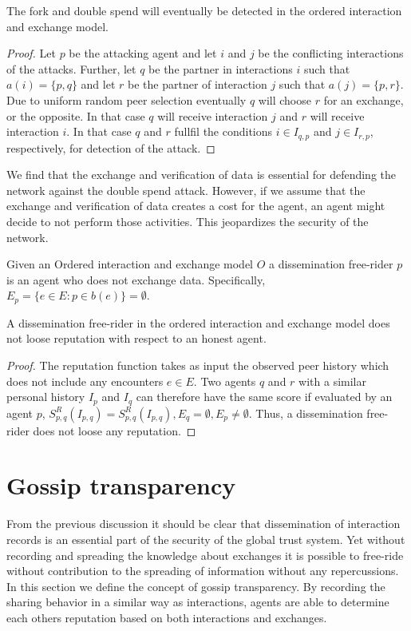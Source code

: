\begin{thm} 
    The fork and double spend will eventually be detected in the ordered interaction and exchange 
    model.
\end{thm}
\begin{proof}
    Let $p$ be the attacking agent and let $i$ and $j$ be the conflicting interactions of the 
    attacks. Further, let $q$ be the partner in interactions $i$ such that $a(i) = \{p, q\}$ and let 
    $r$ be the partner of interaction $j$ such that $a(j) = \{p, r\}$. Due to uniform random peer selection
    eventually $q$ will choose $r$ for an exchange, or the opposite. In that case $q$ will receive 
    interaction $j$ and $r$ will receive interaction $i$. In that case $q$ and $r$ fullfil 
    the conditions $i \in I_{q,p}$ and $j \in I_{r,p}$, respectively, for detection of the attack.
\end{proof}

We find that the exchange and verification of data is essential for defending the network against 
the double spend attack. However, if we assume that the exchange and verification of data creates a
cost for the agent, an agent might decide to not perform those activities. This jeopardizes the 
security of the network.

\begin{defn}
    Given an Ordered interaction and exchange model $O$ a dissemination free-rider $p$ is an agent 
    who does not exchange data. Specifically, $E_p = \{ e \in E : p \in b(e) \} = \emptyset$. 
\end{defn}

\begin{thm} 
    A dissemination free-rider in the ordered interaction and exchange model does not loose 
    reputation with respect to an honest agent.
\end{thm}
\begin{proof}
    The reputation function takes as input the observed peer history which does not include any encounters $e \in E$. Two agents $q$ and $r$ with a similar personal history $I_p$ and $I_q$ can
    therefore have the same score if evaluated by an agent $p$, $S^R_{p,q}(I_{p,q}) = S^R_{p,q}(I_{p,q}), E_q = \emptyset, E_p \neq \emptyset$. Thus, a dissemination free-rider does not loose any
    reputation.
\end{proof}


\section{Gossip transparency}
From the previous discussion it should be clear that dissemination of interaction records is an 
essential part of the security of the global trust system. Yet without recording and spreading the 
knowledge about exchanges it is possible to free-ride without contribution to the spreading of 
information without any repercussions. In this section we define the concept of gossip transparency.
By recording the sharing behavior in a similar way as interactions, agents are able to determine 
each others reputation based on both interactions and exchanges. 

